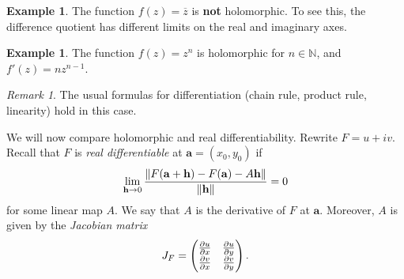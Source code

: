 \documentclass[leqno, openany]{memoir}
\theoremstyle{definition}
\newtheorem{exm}[thm]{Example}
\theoremstyle{remark}
\newtheorem{rmk}[thm]{Remark}
\theoremstyle{plain}
\theoremstyle{definition}
\theoremstyle{remark}
\newcommand{\N}{\mathbb{N}}
\newcommand{\ol}[1]{\overline{#1}}
\begin{document}
\begin{exm}
    The function $f(z) = \ol{z}$ is \textbf{not} holomorphic. To see this, the difference quotient has different limits on the real and imaginary axes.
\end{exm}

\begin{exm}
    The function $f(z) = z^n$ is holomorphic for $n \in \N$, and $f'(z) = nz^{n-1}$.
\end{exm}

\begin{rmk}
    The usual formulas for differentiation (chain rule, product rule, linearity) hold in this case.
\end{rmk}

We will now compare holomorphic and real differentiability. Rewrite $F = u + iv$. Recall that $F$ is \textit{real differentiable} at $\mathbf{a} = (x_0,y_0)$ if 
\[ \lim_{\mathbf{h} \to 0} \frac{\norm{F(\mathbf{a} + \mathbf{h}) - F(\mathbf{a}) - A \mathbf{h}}}{\norm{\mathbf{h}}} = 0 \]
for some linear map $A$. We say that $A$ is the derivative of $F$ at $\mathbf{a}$. Moreover, $A$ is given by the \textit{Jacobian matrix}
\[ J_F = \begin{pmatrix}
    \pdv{u}{x} & \pdv{u}{y} \\
    \pdv{v}{x} & \pdv{v}{y}
\end{pmatrix}. \]
\end{document}
